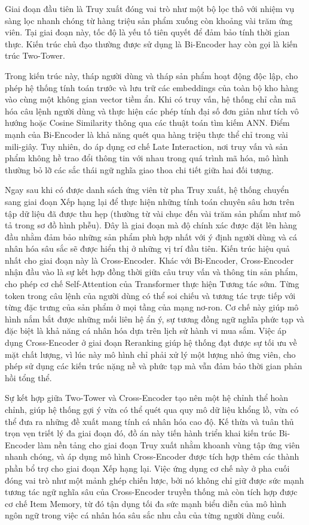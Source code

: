 Giai đoạn đầu tiên là Truy xuất đóng vai trò như một bộ lọc thô với nhiệm vụ sàng lọc nhanh chóng từ hàng triệu sản phẩm xuống còn khoảng vài trăm ứng viên. Tại giai đoạn này, tốc độ là yếu tố tiên quyết để đảm bảo tính thời gian thực. Kiến trúc chủ đạo thường được sử dụng là Bi-Encoder hay còn gọi là kiến trúc Two-Tower.

Trong kiến trúc này, tháp người dùng và tháp sản phẩm hoạt động độc lập, cho phép hệ thống tính toán trước và lưu trữ các embeddings của toàn bộ kho hàng vào cùng một không gian vector tiềm ẩn. Khi có truy vấn, hệ thống chỉ cần mã hóa câu lệnh người dùng và thực hiện các phép tính đại số đơn giản như tích vô hướng hoặc Cosine Similarity thông qua các thuật toán tìm kiếm ANN. Điểm mạnh của Bi-Encoder là khả năng quét qua hàng triệu thực thể chỉ trong vài mili-giây. Tuy nhiên, do áp dụng cơ chế Late Interaction, nơi truy vấn và sản phẩm không hề trao đổi thông tin với nhau trong quá trình mã hóa, mô hình thường bỏ lỡ các sắc thái ngữ nghĩa giao thoa chi tiết giữa hai đối tượng.

Ngay sau khi có được danh sách ứng viên từ pha Truy xuất, hệ thống chuyển sang giai đoạn Xếp hạng lại để thực hiện những tính toán chuyên sâu hơn trên tập dữ liệu đã được thu hẹp (thường từ vài chục đến vài trăm sản phẩm như mô tả trong sơ đồ hình phễu). Đây là giai đoạn mà độ chính xác được đặt lên hàng đầu nhằm đảm bảo những sản phẩm phù hợp nhất với ý định người dùng và cá nhân hóa sâu sắc sẽ được hiển thị ở những vị trí đầu tiên. Kiến trúc hiệu quả nhất cho giai đoạn này là Cross-Encoder. Khác với Bi-Encoder, Cross-Encoder nhận đầu vào là sự kết hợp đồng thời giữa câu truy vấn và thông tin sản phẩm, cho phép cơ chế Self-Attention của Transformer thực hiện Tương tác sớm. Từng token trong câu lệnh của người dùng có thể soi chiếu và tương tác trực tiếp với từng đặc trưng của sản phẩm ở mọi tầng của mạng nơ-ron. Cơ chế này giúp mô hình nắm bắt được những mối liên hệ ẩn ý, sự tương đồng ngữ nghĩa phức tạp và đặc biệt là khả năng cá nhân hóa dựa trên lịch sử hành vi mua sắm. Việc áp dụng Cross-Encoder ở giai đoạn Reranking giúp hệ thống đạt được sự tối ưu về mặt chất lượng, vì lúc này mô hình chỉ phải xử lý một lượng nhỏ ứng viên, cho phép sử dụng các kiến trúc nặng nề và phức tạp mà vẫn đảm bảo thời gian phản hồi tổng thể.

Sự kết hợp giữa Two-Tower và Cross-Encoder tạo nên một hệ chỉnh thể hoàn chỉnh, giúp hệ thống gợi ý vừa có thể quét qua quy mô dữ liệu khổng lồ, vừa có thể đưa ra những đề xuất mang tính cá nhân hóa cao độ. Kế thừa và tuân thủ trọn vẹn triết lý đa giai đoạn đó, đồ án này tiến hành triển khai kiến trúc Bi-Encoder làm nền tảng cho giai đoạn Truy xuất nhằm khoanh vùng tập ứng viên nhanh chóng, và áp dụng mô hình Cross-Encoder được tích hợp thêm các thành phần bổ trợ cho giai đoạn Xếp hạng lại. Việc ứng dụng cơ chế này ở pha cuối đóng vai trò như một mảnh ghép chiến lược, bởi nó không chỉ giữ được sức mạnh tương tác ngữ nghĩa sâu của Cross-Encoder truyền thống mà còn tích hợp được cơ chế Item Memory, từ đó tận dụng tối đa sức mạnh biểu diễn của mô hình ngôn ngữ trong việc cá nhân hóa sâu sắc nhu cầu của từng người dùng cuối.

